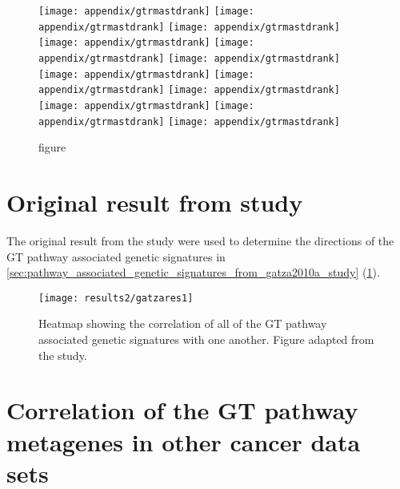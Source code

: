 	\begin{figure}[htpb]
		\ContinuedFloat
		\captionsetup{list=off,format=cont}
		\centering
		\texttt{[image: appendix/gtrmastdrank]}
		\texttt{[image: appendix/gtrmastdrank]}
		\texttt{[image: appendix/gtrmastdrank]}\\
		\texttt{[image: appendix/gtrmastdrank]}
		\texttt{[image: appendix/gtrmastdrank]}
		\texttt{[image: appendix/gtrmastdrank]}\\
		\texttt{[image: appendix/gtrmastdrank]}
		\texttt{[image: appendix/gtrmastdrank]}
		\texttt{[image: appendix/gtrmastdrank]}\\
		\texttt{[image: appendix/gtrmastdrank]}
		\texttt{[image: appendix/gtrmastdrank]}
		\texttt{[image: appendix/gtrmastdrank]}\\
		\caption[]{figure}
	\end{figure}

	\newpage

	\section{Original result from \citet{Gatza2010a} study}
	\label{sec:result_from_gatza2010a_study}

	The original result from the \citet{Gatza2010a} study were used to determine the directions of the GT pathway associated genetic signatures in \cref{sec:pathway_associated_genetic_signatures_from_gatza2010a_study} (\cref{fig:gatza_paper_res}).

	\begin{figure}[htpb]
		\centering
		\texttt{[image: results2/gatzares1]}
		\caption[Original result presented in the \citet{Gatza2010a} study]{Heatmap showing the correlation of all of the GT pathway associated genetic signatures with one another.
		Figure adapted from the \citet{Gatza2010a} study.}
		\label{fig:gatza_paper_res}
	\end{figure}

	\section{Correlation of the GT pathway metagenes in other cancer data sets}
	\label{sec:correlation_of_the_gt_pathway_metagenes_in_other_cancer_data_sets}

